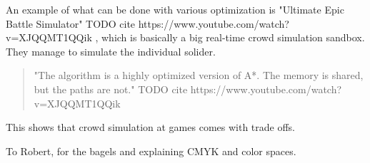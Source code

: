 \documentclass[sigconf]{acmart}
\begin{document}
An example of what can be done with various optimization is "Ultimate Epic Battle Simulator" TODO cite https://www.youtube.com/watch?v=XJQQMT1QQik , which is basically a big real-time crowd simulation sandbox. They manage to simulate the individual solider. 
\begin{quote}
"The algorithm is a highly optimized version of A*.  The memory is shared, but the paths are not."  TODO cite https://www.youtube.com/watch?v=XJQQMT1QQik 
\end{quote} This shows that crowd simulation at games comes with trade offs. 

\begin{acks}
To Robert, for the bagels and explaining CMYK and color spaces.
\end{acks}




\appendix
\end{document}
